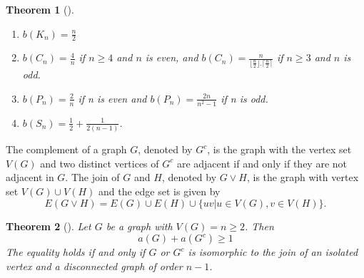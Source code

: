 \documentclass[12pt]{article}
\newtheorem{theorem}{Theorem}[section]
\DeclareMathOperator{\iso}{iso}
\begin{document}
\begin{theorem}[{\cite{enide-geir-2024}}]\label{b_cycle_path_star_compl}
    \begin{enumerate}
        \item $b(K_n)=\frac{n}{2}$
        \item $b(C_n)=\frac{4}{n}$ if $n\geq 4$ and $n$ is even, and $b(C_n)=\frac{n}{\lfloor \frac{n}{2}  \rfloor. \lceil \frac{n}{2} \rceil }$ if $n \geq 3$ and $n$ is odd.
        \item $b(P_n)=\frac{2}{n}$ if n is even and $b(P_n)=\frac{2n}{n^2 -1}$ if n is odd.
        \item $b(S_n)= \frac{1}{2}+\frac{1}{2(n-1)}$.
    \end{enumerate}
\end{theorem}

The complement of a graph $G$, denoted by $G^c$, is the graph with the vertex set $V(G)$ and two distinct vertices of $G^c$ are adjacent if and only if they are not adjacent in $G$.
The join of $G$ and $H$, denoted by $G \vee H$, is the graph with vertex set $V(G) \cup V(H)$ and the edge set is given by
$$
E(G \vee H)= E(G) \cup E(H) \cup  \{uv| u \in V(G), v \in V(H)\}.
$$
\begin{theorem}[{\cite{MR4281912}\label{alg-low-bound}}]
    Let $G$ be a graph with $V(G)=n \geq 2$. Then
    $$
a(G)+a(G^c) \geq 1
    $$
    The equality holds if and only if $G$ or $G^c$ is isomorphic to the join of an isolated vertex and a disconnected graph of order $n-1$.
\end{theorem}


\end{document}
